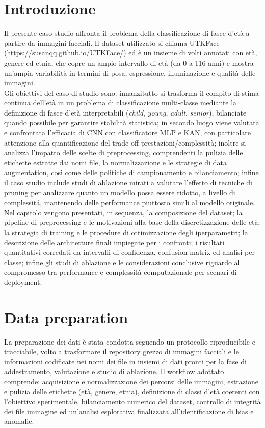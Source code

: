 \documentclass[a4paper,12pt]{report}
\begin{document}
	\section{Introduzione}
	Il presente caso studio affronta il problema della classificazione di fasce d'età a partire da immagini facciali. Il dataset utilizzato si chiama UTKFace (\url{https://susanqq.github.io/UTKFace/}) ed è un insieme di volti annotati con età, genere ed etnia, che copre un ampio intervallo di età (da 0 a 116 anni) e mostra un'ampia variabilità in termini di posa, espressione, illuminazione e qualità delle immagini. \\
	Gli obiettivi del caso di studio sono: innanzitutto si trasforma il compito di stima continua dell'età in un problema di classificazione multi-classe mediante la definizione di fasce d'età interpretabili (\textit{child}, \textit{young}, \textit{adult}, \textit{senior}), bilanciate quando possibile per garantire stabilità statistica; in secondo luogo viene valutata e confrontata l'efficacia di CNN con classificatore MLP e KAN, con particolare attenzione alla quantificazione del trade-off prestazioni/complessità; inoltre si analizza l'impatto delle scelte di preprocessing, comprendenti la pulizia delle etichette estratte dai nomi file, la normalizzazione e le strategie di data augmentation, così come delle politiche di campionamento e bilanciamento; infine il caso studio include studi di ablazione mirati a valutare l’effetto di tecniche di pruning per analizzare quanto un modello possa essere ridotto, a livello di complessitá, mantenendo delle performance piuttosto simili al modello originale. \\
	Nel capitolo vengono presentati, in sequenza, la composizione del dataset; la pipeline di preprocessing e le motivazioni alla base della discretizzazione delle età; la strategia di training e le procedure di ottimizzazione degli iperparametri; la descrizione delle architetture finali impiegate per i confronti; i risultati quantitativi corredati da intervalli di confidenza, confusion matrix ed analisi per classe; infine gli studi di ablazione e le considerazioni conclusive riguardo al compromesso tra performance e complessità computazionale per scenari di deployment.
	
	\section{Data preparation}
	
	La preparazione dei dati è stata condotta seguendo un protocollo riproducibile e tracciabile, volto a trasformare il repository grezzo di immagini facciali e le informazioni codificate nei nomi dei file in insiemi di dati pronti per la fase di addestramento, valutazione e studio di ablazione. Il workflow adottato comprende: acquisizione e normalizzazione dei percorsi delle immagini, estrazione e pulizia delle etichette (età, genere, etnia), definizione di classi d'età coerenti con l'obiettivo sperimentale, bilanciamento numerico del dataset, controllo di integrità dei file immagine ed un'analisi esplorativa finalizzata all'identificazione di bias e anomalie.
	
\end{document}
